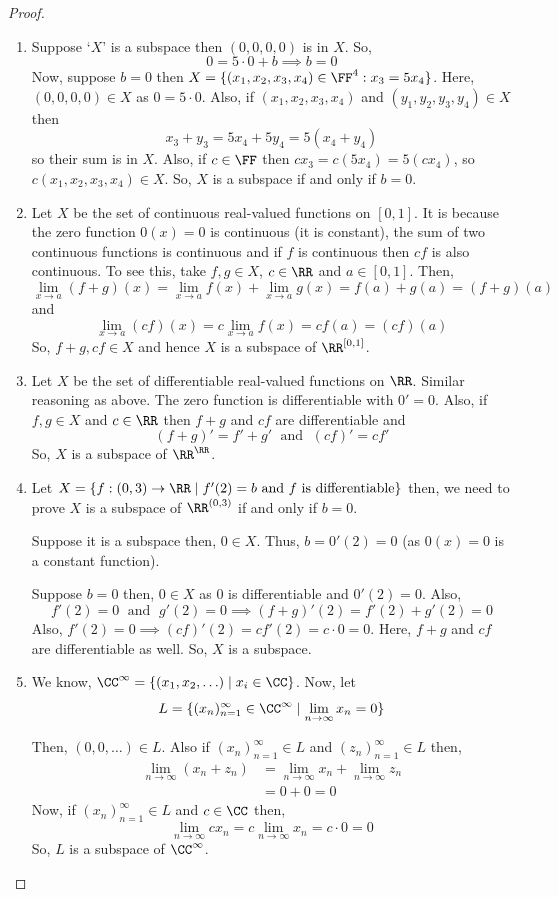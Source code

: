 \begin{proof} \leavevmode
\begin{enumerate}
\item[(a)] Suppose `$X$' is a subspace then $(0,0,0,0)$ is in $X$. So,
\[
0 = 5 \cdot 0 + b \implies b = 0
\]
Now, suppose $b = 0$ then $X = \{(x_1, x_2, x_3, x_4) \in \FF^4 : x_3 = 5x_4\}$. Here, $(0,0,0,0) \in X$ as $0 = 5 \cdot 0$. Also, if $(x_1, x_2, x_3, x_4)$ and $(y_1, y_2, y_3, y_4) \in X$ then
\[
x_3 + y_3 = 5x_4 + 5y_4 = 5(x_4 + y_4)
\]
so their sum is in $X$. Also, if $c \in \FF$ then $cx_3 = c(5x_4) = 5(cx_4)$, so $c(x_1, x_2, x_3, x_4) \in X$. So, $X$ is a subspace if and only if $b = 0$.
\item[(b)] Let $X$ be the set of continuous real-valued functions on $[0,1]$. It is because the zero function $0(x) = 0$ is continuous (it is constant), the sum of two continuous functions is continuous and if $f$ is continuous then $cf$ is also continuous. To see this, take $f, g \in X$, $c \in \RR$ and $a \in [0,1]$. Then,
\[
\lim_{x \to a} (f+g)(x) = \lim_{x \to a} f(x) + \lim_{x \to a} g(x) = f(a) + g(a) = (f+g)(a)
\]
and
\[
\lim_{x \to a} (cf)(x) = c \lim_{x \to a} f(x) = cf(a) = (cf)(a)
\]
So, $f+g, cf \in X$ and hence $X$ is a subspace of $\RR^{[0,1]}$.
\item[(c)] Let $X$ be the set of differentiable real-valued functions on $\RR$. Similar reasoning as above. The zero function is differentiable with $0' = 0$. Also, if $f, g \in X$ and $c \in \RR$ then $f+g$ and $cf$ are differentiable and
\[
(f+g)' = f' + g' \;\text{ and }\; (cf)' = cf'
\]
So, $X$ is a subspace of $\RR^{\RR}$.
\item[(d)] Let $X = \{f : (0,3) \to \RR \mid f'(2) = b \text{ and } f \text{ is differentiable}\}$ then, we need to prove $X$ is a subspace of
$\RR^{(0,3)}$ if and only if $b = 0$.

Suppose it is a subspace then, $0 \in X$. Thus, $b = 0'(2) = 0$ (as $0(x) = 0$ is a constant function).

Suppose $b = 0$ then, $0 \in X$ as $0$ is differentiable and $0'(2) = 0$. Also,
\[
f'(2) = 0 \; \text{ and }\; g'(2) = 0 \implies (f+g)'(2) = f'(2) + g'(2) = 0
\]
Also, $f'(2) = 0 \implies (cf)'(2) = cf'(2) = c \cdot 0 = 0$. Here, $f+g$ and $cf$ are differentiable as well. So, $X$ is a subspace.
\item[(e)] We know, $\CC^{\infty} = \{(x_1, x_2, \ldots) \mid x_i \in \CC\}$. Now, let
\[ L = \{(x_n)_{n=1}^{\infty} \in \CC^{\infty} \mid \lim_{n \to \infty} x_n = 0\} \]

Then, $(0,0,\ldots) \in L$. Also if $(x_n)_{n=1}^{\infty} \in L$ and $(z_n)_{n=1}^{\infty} \in L$ then,
\begin{align*}
\lim_{n \to \infty} (x_n + z_n) &= \lim_{n \to \infty} x_n + \lim_{n \to \infty} z_n \\
&= 0 + 0 = 0
\end{align*}
Now, if $(x_n)_{n=1}^{\infty} \in L$ and $c \in \CC$ then,
\[
\lim_{n \to \infty} c x_n = c \lim_{n \to \infty} x_n = c \cdot 0 = 0
\]
So, $L$ is a subspace of $\CC^{\infty}$.
\end{enumerate}
\end{proof}

